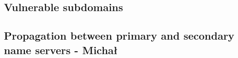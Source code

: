 \subsection{Vulnerable subdomains}
\subsection{Propagation between primary and secondary name servers - Michał}

